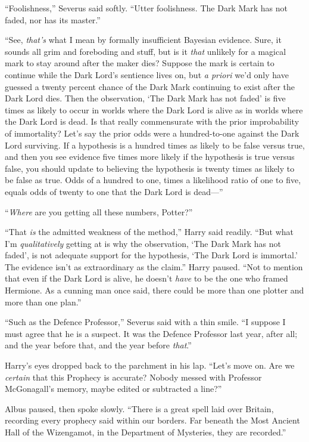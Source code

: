 “Foolishness,” Severus said softly. “Utter foolishness. The Dark Mark has not faded, nor has its master.”

“See, \emph{that’s} what I mean by formally insufficient Bayesian evidence. Sure, it sounds all grim and foreboding and stuff, but is it \emph{that} unlikely for a magical mark to stay around after the maker dies? Suppose the mark is certain to continue while the Dark Lord’s sentience lives on, but \emph{a priori} we’d only have guessed a twenty percent chance of the Dark Mark continuing to exist after the Dark Lord dies. Then the observation, ‘The Dark Mark has not faded’ is five times as likely to occur in worlds where the Dark Lord is alive as in worlds where the Dark Lord is dead. Is that really commensurate with the prior improbability of immortality? Let’s say the prior odds were a hundred-to-one against the Dark Lord surviving. If a hypothesis is a hundred times as likely to be false versus true, and then you see evidence five times more likely if the hypothesis is true versus false, you should update to believing the hypothesis is twenty times as likely to be false as true. Odds of a hundred to one, times a likelihood ratio of one to five, equals odds of twenty to one that the Dark Lord is dead—”

“\emph{Where} are you getting all these numbers, Potter?”

“That \emph{is} the admitted weakness of the method,” Harry said readily. “But what I’m \emph{qualitatively} getting at is why the observation, ‘The Dark Mark has not faded’, is not adequate support for the hypothesis, ‘The Dark Lord is immortal.’ The evidence isn’t as extraordinary as the claim.” Harry paused. “Not to mention that even if the Dark Lord is alive, he doesn’t \emph{have} to be the one who framed Hermione. As a cunning man once said, there could be more than one plotter and more than one plan.”

“Such as the Defence Professor,” Severus said with a thin smile. “I suppose I must agree that he is a suspect. It was the Defence Professor last year, after all; and the year before that, and the year before \emph{that}.”

Harry’s eyes dropped back to the parchment in his lap. “Let’s move on. Are we \emph{certain} that this Prophecy is accurate? Nobody messed with Professor McGonagall’s memory, maybe edited or subtracted a line?”

Albus paused, then spoke slowly. “There is a great spell laid over Britain, recording every prophecy said within our borders. Far beneath the Most Ancient Hall of the Wizengamot, in the Department of Mysteries, they are recorded.”

